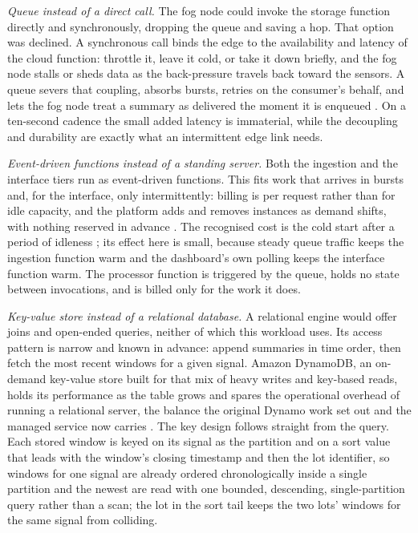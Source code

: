 \documentclass[conference]{IEEEtran}
\begin{document}
\textit{Queue instead of a direct call.} The fog node could invoke the storage function directly and synchronously, dropping the queue and saving a hop. That option was declined. A synchronous call binds the edge to the availability and latency of the cloud function: throttle it, leave it cold, or take it down briefly, and the fog node stalls or sheds data as the back-pressure travels back toward the sensors. A queue severs that coupling, absorbs bursts, retries on the consumer's behalf, and lets the fog node treat a summary as delivered the moment it is enqueued \cite{hohpe2003}. On a ten-second cadence the small added latency is immaterial, while the decoupling and durability are exactly what an intermittent edge link needs.

\textit{Event-driven functions instead of a standing server.} Both the ingestion and the interface tiers run as event-driven functions. This fits work that arrives in bursts and, for the interface, only intermittently: billing is per request rather than for idle capacity, and the platform adds and removes instances as demand shifts, with nothing reserved in advance \cite{armbrust2010}. The recognised cost is the cold start after a period of idleness \cite{wang2018}; its effect here is small, because steady queue traffic keeps the ingestion function warm and the dashboard's own polling keeps the interface function warm. The processor function is triggered by the queue, holds no state between invocations, and is billed only for the work it does.

\textit{Key-value store instead of a relational database.} A relational engine would offer joins and open-ended queries, neither of which this workload uses. Its access pattern is narrow and known in advance: append summaries in time order, then fetch the most recent windows for a given signal. Amazon DynamoDB, an on-demand key-value store built for that mix of heavy writes and key-based reads, holds its performance as the table grows and spares the operational overhead of running a relational server, the balance the original Dynamo work set out and the managed service now carries \cite{decandia2007, elhemali2022}. The key design follows straight from the query. Each stored window is keyed on its signal as the partition and on a sort value that leads with the window's closing timestamp and then the lot identifier, so windows for one signal are already ordered chronologically inside a single partition and the newest are read with one bounded, descending, single-partition query rather than a scan; the lot in the sort tail keeps the two lots' windows for the same signal from colliding.
\end{document}
